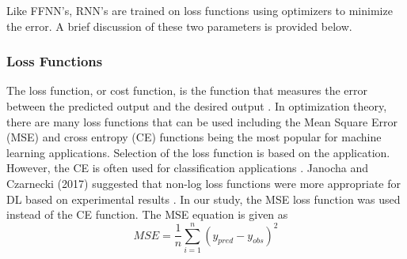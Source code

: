 \documentclass[preprint,12pt,a4paper,authoryear]{elsarticle}
\begin{document}
\begin{linenumbers}
Like FFNN's, RNN's are trained on loss functions using optimizers to minimize the error. A brief discussion of these two parameters is provided below.

\subsubsection{Loss Functions}

The loss function, or cost function, is the function that measures the error between the predicted output and the desired output \citep{Goodfellow2016}. In optimization theory, there are many loss functions that can be used including the Mean Square Error (MSE) and cross entropy (CE) functions being the most popular for machine learning applications.  Selection of the loss function is based on the application. However, the CE is often used for classification applications \citep{Kline2005, Wu2017}. Janocha and Czarnecki (2017) suggested that non-log loss functions were more appropriate for DL based on experimental results \citep{Janocha2017}. In our study, the MSE loss function was used instead of the CE function. The MSE equation is given as 
%
\begin{equation}
\label{eq:MSE}
MSE = \frac{1}{n} \sum_{i=1}^{n} \left( y_{pred} - y_{obs} \right)^{2}
\end{equation}
%

\end{linenumbers}
\end{document}
